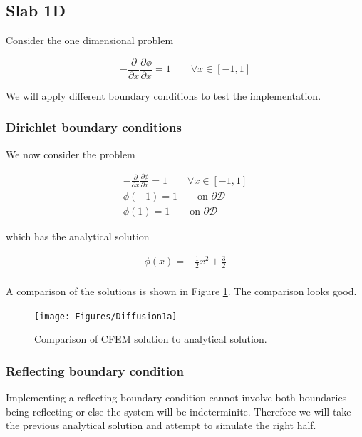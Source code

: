\documentclass[11pt,letterpaper,titlepage]{article}
\newcommand{\bOmega}{\mathcal{D}}
\numberwithin{equation}{section}
\begin{document}
\subsection{Slab 1D}
Consider the one dimensional problem

\begin{equation*}
-\frac{\partial}{\partial x} \frac{\partial \phi}{\partial x} = 1 \quad \quad \forall x \in [-1,1]
\end{equation*}

We will apply different boundary conditions to test the implementation.

\subsubsection{Dirichlet boundary conditions}
We now consider the problem

\begin{equation*}
\begin{aligned}
-\frac{\partial}{\partial x} \frac{\partial \phi}{\partial x} = 1 \quad \quad \forall x \in [-1,1] \\
\phi(-1) = 1 \quad \quad \text{on } \partial \bOmega \\
\phi(1) = 1 \quad \quad \text{on } \partial \bOmega
\end{aligned}
\end{equation*}

which has the analytical solution

\begin{equation*}
\begin{aligned}
\phi(x) = -\frac{1}{2}x^2 + \frac{3}{2} \\
\end{aligned}
\end{equation*}

A comparison of the solutions is shown in Figure \ref{fig:Diffusion1a}. The comparison looks good.

\begin{figure}[H]
\centering
\texttt{[image: Figures/Diffusion1a]}
\caption{Comparison of CFEM solution to analytical solution.}
\label{fig:Diffusion1a}
\end{figure}

\subsubsection{Reflecting boundary condition}
Implementing a reflecting boundary condition cannot involve both boundaries being reflecting or else the system will be indeterminite. Therefore we will take the previous analytical solution and attempt to simulate the right half.
\end{document}
